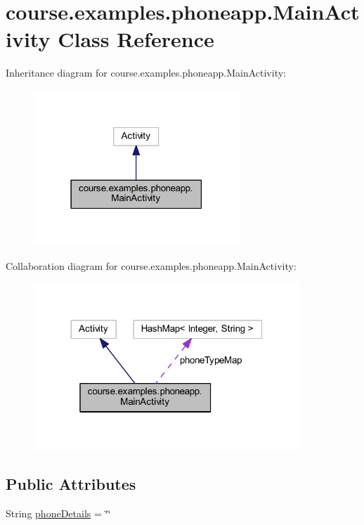 \hypertarget{classcourse_1_1examples_1_1phoneapp_1_1_main_activity}{}\section{course.\+examples.\+phoneapp.\+Main\+Activity Class Reference}
\label{classcourse_1_1examples_1_1phoneapp_1_1_main_activity}


Inheritance diagram for course.\+examples.\+phoneapp.\+Main\+Activity\+:
\nopagebreak
\begin{figure}[H]
\begin{center}
\leavevmode
\includegraphics[width=219pt]{classcourse_1_1examples_1_1phoneapp_1_1_main_activity__inherit__graph}
\end{center}
\end{figure}


Collaboration diagram for course.\+examples.\+phoneapp.\+Main\+Activity\+:
\nopagebreak
\begin{figure}[H]
\begin{center}
\leavevmode
\includegraphics[width=284pt]{classcourse_1_1examples_1_1phoneapp_1_1_main_activity__coll__graph}
\end{center}
\end{figure}
\subsection*{Public Attributes}
\begin{DoxyCompactItemize}
\item 
String \hyperlink{classcourse_1_1examples_1_1phoneapp_1_1_main_activity_a2e49349c76e07dceda2b968b25b2f12e}{phone\+Details} = \char`\"{}\char`\"{}
\end{DoxyCompactItemize}

